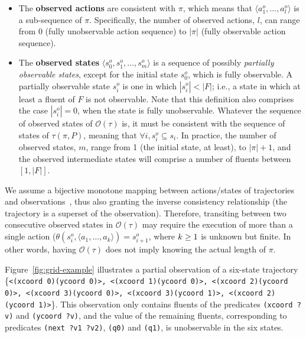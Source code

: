 \documentclass[letterpaper]{article} %
\newcommand{\tup}[1]{{\langle #1 \rangle}}
\begin{document}
\begin{itemize}
\item The {\bf observed actions} are consistent with $\pi$, which means that $\tup{a_1^o, \ldots, a_l^o}$ is a sub-sequence of $\pi$. Specifically, the number of observed actions, $l$, can range from $0$ (fully unobservable action sequence) to $|\pi|$ (fully observable action sequence).
\item The {\bf observed states} $\tup{s_0^o, s_1^o, \ldots, s_m^o}$ is a sequence of possibly {\em partially observable states}, except for the initial state $s_0^o$, which is fully observable. A partially observable state $s_i^o$ is one in which $|s_i^o| < |F|$; i.e., a state in which at least a fluent of $F$ is not observable. Note that this definition also comprises the case $|s_i^o| = 0$, when the state is fully unobservable. Whatever the sequence of observed states of $\mathcal{O}(\tau)$ is, it must be consistent with the sequence of states of $\tau(\pi,P)$, meaning that $\forall i, s_i^o \subseteq s_i$. In practice, the number of observed states, $m$, range from 1 (the initial state, at least), to $|\pi|+1$, and the observed intermediate states will comprise a number of fluents between $[1,|F|]$.
\end{itemize}

We assume a bijective monotone mapping between actions/states of trajectories and observations~\cite{ramirez2009plan}, thus also granting the inverse consistency relationship (the trajectory is a superset of the observation). Therefore, transiting between two consecutive observed states in $\mathcal{O}(\tau)$ may require the execution of more than a single action ($\theta(s_i^o,\tup{a_1,\ldots,a_k})=s_{i+1}^o$, where ${\small k\geq 1}$ is unknown but finite. In other words, having $\mathcal{O}(\tau)$ does not imply knowing the actual length of $\pi$.

Figure~\ref{fig:grid-example} illustrates a partial observation of a six-state trajectory \{{\tt\scriptsize<(xcoord 0)(ycoord 0)>, <(xcoord 1)(ycoord 0)>, <(xcoord 2)(ycoord 0)>, <(xcoord 3)(ycoord 0)>, <(xcoord 3)(ycoord 1)>, <(xcoord 2)(ycoord 1)>}\}. This observation only contains fluents of the predicates {\tt\small (xcoord ?v)} and {\tt\small (ycoord ?v)}, and the value of the remaining fluents, corresponding to predicates {\tt\small (next ?v1 ?v2)}, {\tt\small (q0)} and {\tt\small (q1)}, is unobservable in the six states.
\end{document}
